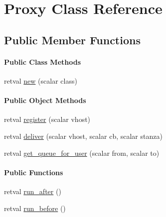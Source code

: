 \hypertarget{class_d_jabberd_1_1_delivery_1_1_proxy}{
\section{\-Proxy \-Class \-Reference}
\label{class_d_jabberd_1_1_delivery_1_1_proxy}
}
\subsection*{\-Public \-Member \-Functions}
\begin{Indent}\paragraph*{\-Public \-Class \-Methods}
\begin{DoxyCompactItemize}
\item 
retval \hyperlink{class_d_jabberd_1_1_delivery_1_1_proxy_a04de1185dad12c1c24cac9235c2bbeff}{new} (scalar class)
\end{DoxyCompactItemize}
\end{Indent}
\begin{Indent}\paragraph*{\-Public \-Object \-Methods}
\begin{DoxyCompactItemize}
\item 
retval \hyperlink{class_d_jabberd_1_1_delivery_1_1_proxy_ad74fd0b541e604cd2a3dd55e48bb8fde}{register} (scalar vhost)
\item 
retval \hyperlink{class_d_jabberd_1_1_delivery_1_1_proxy_a2346eca32155d08c609667965942ef9b}{deliver} (scalar vhost, scalar cb, scalar stanza)
\item 
retval \hyperlink{class_d_jabberd_1_1_delivery_1_1_proxy_abaa2aaec3fb323617545a88abe7b40ad}{get\-\_\-queue\-\_\-for\-\_\-user} (scalar from, scalar to)
\end{DoxyCompactItemize}
\end{Indent}
\begin{Indent}\paragraph*{\-Public \-Functions}
\begin{DoxyCompactItemize}
\item 
retval \hyperlink{class_d_jabberd_1_1_delivery_1_1_proxy_a499abe180750985dc63b2a2e7cf4645d}{run\-\_\-after} ()
\item 
retval \hyperlink{class_d_jabberd_1_1_delivery_1_1_proxy_a46daffe943152d5dd78bfb14b2a8ac17}{run\-\_\-before} ()
\end{DoxyCompactItemize}
\end{Indent}


